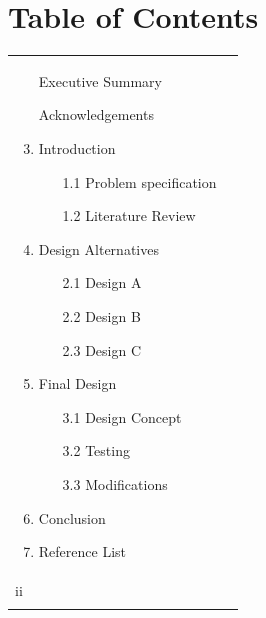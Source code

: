 \documentclass[12pt]{report}
\begin{document}
\section*{Table of Contents}
\begin{tabular}{ p{} p{} }

\begin{enumerate}
    \item []Executive Summary 
    \item []Acknowledgements 
    \item Introduction 
	\begin{enumerate}
	\item [1.1] Problem specification
	\item [1.2]	Literature Review    
	\end{enumerate}
\item Design Alternatives 
	\begin{enumerate}
	\item [2.1]	Design A 
	\item [2.2]	Design B 
	\item [2.3]	Design C 
	\end{enumerate}
\item Final Design 
	\begin{enumerate}
	\item [3.1] Design Concept
    \item [3.2] Testing
    \item [3.3] Modifications
	\end{enumerate}
\item Conclusion
\item Reference List
\end{enumerate}

&
\begin{flushright}
i \\[0.2\linewidth]
ii \\[0.2\linewidth]
\end{flushright}
\end{tabular}
\pagebreak
\end{document}
